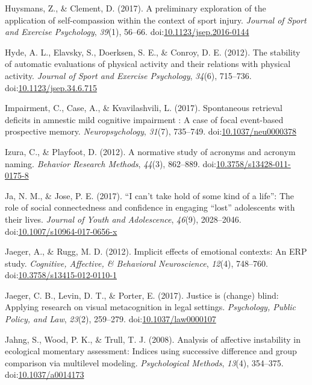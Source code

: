\documentclass[english,man]{apa6}
\begin{document}
\hypertarget{ref-Huysmans2017}{}
Huysmans, Z., \& Clement, D. (2017). A preliminary exploration of the
application of self-compassion within the context of sport injury.
\emph{Journal of Sport and Exercise Psychology}, \emph{39}(1), 56--66.
doi:\href{https://doi.org/10.1123/jsep.2016-0144}{10.1123/jsep.2016-0144}

\hypertarget{ref-Hyde2012}{}
Hyde, A. L., Elavsky, S., Doerksen, S. E., \& Conroy, D. E. (2012). The
stability of automatic evaluations of physical activity and their
relations with physical activity. \emph{Journal of Sport and Exercise
Psychology}, \emph{34}(6), 715--736.
doi:\href{https://doi.org/10.1123/jsep.34.6.715}{10.1123/jsep.34.6.715}

\hypertarget{ref-Impairment2017}{}
Impairment, C., Case, A., \& Kvavilashvili, L. (2017). Spontaneous
retrieval deficits in amnestic mild cognitive impairment : A case of
focal event-based prospective memory. \emph{Neuropsychology},
\emph{31}(7), 735--749.
doi:\href{https://doi.org/10.1037/neu0000378}{10.1037/neu0000378}

\hypertarget{ref-Izura2012}{}
Izura, C., \& Playfoot, D. (2012). A normative study of acronyms and
acronym naming. \emph{Behavior Research Methods}, \emph{44}(3),
862--889.
doi:\href{https://doi.org/10.3758/s13428-011-0175-8}{10.3758/s13428-011-0175-8}

\hypertarget{ref-Ja2017}{}
Ja, N. M., \& Jose, P. E. (2017). ``I can't take hold of some kind of a
life'': The role of social connectedness and confidence in engaging
``lost'' adolescents with their lives. \emph{Journal of Youth and
Adolescence}, \emph{46}(9), 2028--2046.
doi:\href{https://doi.org/10.1007/s10964-017-0656-x}{10.1007/s10964-017-0656-x}

\hypertarget{ref-Jaeger2012}{}
Jaeger, A., \& Rugg, M. D. (2012). Implicit effects of emotional
contexts: An ERP study. \emph{Cognitive, Affective, \& Behavioral
Neuroscience}, \emph{12}(4), 748--760.
doi:\href{https://doi.org/10.3758/s13415-012-0110-1}{10.3758/s13415-012-0110-1}

\hypertarget{ref-Jaeger2017}{}
Jaeger, C. B., Levin, D. T., \& Porter, E. (2017). Justice is (change)
blind: Applying research on visual metacognition in legal settings.
\emph{Psychology, Public Policy, and Law}, \emph{23}(2), 259--279.
doi:\href{https://doi.org/10.1037/law0000107}{10.1037/law0000107}

\hypertarget{ref-Jahng2008}{}
Jahng, S., Wood, P. K., \& Trull, T. J. (2008). Analysis of affective
instability in ecological momentary assessment: Indices using successive
difference and group comparison via multilevel modeling.
\emph{Psychological Methods}, \emph{13}(4), 354--375.
doi:\href{https://doi.org/10.1037/a0014173}{10.1037/a0014173}
\end{document}

